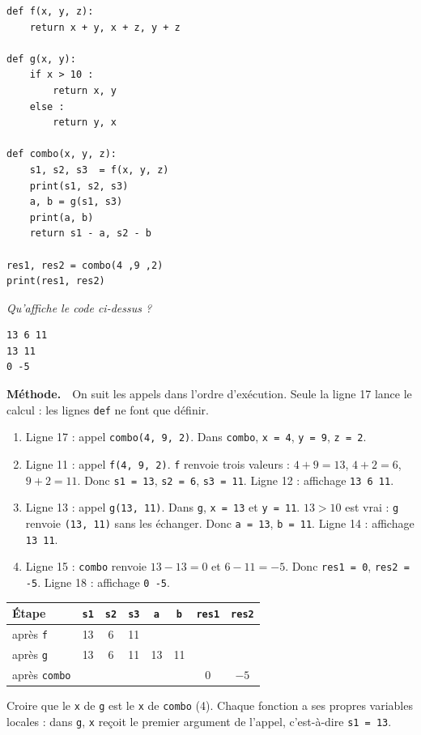 \documentclass[addpoints, 11pt]{exam}
\newcommand{\enonce}[1]{\textit{#1}\par\smallskip}
\newcommand{\methode}{\par\smallskip\noindent\textbf{Méthode.}\ }
\newcommand{\code}[1]{\texttt{#1}}
\DeclareRobustCommand{\_}{\textunderscore\allowbreak}
\begin{document}
\begin{questions}
\begin{lstlisting}
def f(x, y, z):
    return x + y, x + z, y + z

def g(x, y):
    if x > 10 :
        return x, y
    else :
        return y, x

def combo(x, y, z):
    s1, s2, s3  = f(x, y, z)
    print(s1, s2, s3)
    a, b = g(s1, s3)
    print(a, b)
    return s1 - a, s2 - b

res1, res2 = combo(4 ,9 ,2)
print(res1, res2)
\end{lstlisting}

\question[3] \enonce{Qu'affiche le code ci-dessus ?}
\begin{reponse}
\begin{lstlisting}[style=sortie]
13 6 11
13 11
0 -5
\end{lstlisting}
\end{reponse}
\methode\ On suit les appels dans l'ordre d'exécution. Seule la ligne 17 lance le calcul : les lignes \code{def} ne font que définir.
\begin{enumerate}
  \item Ligne 17 : appel \code{combo(4, 9, 2)}. Dans \code{combo}, \code{x = 4}, \code{y = 9}, \code{z = 2}.
  \item Ligne 11 : appel \code{f(4, 9, 2)}. \code{f} renvoie trois valeurs : $4 + 9 = 13$, $4 + 2 = 6$, $9 + 2 = 11$. Donc \code{s1 = 13}, \code{s2 = 6}, \code{s3 = 11}. Ligne 12 : affichage \code{13 6 11}.
  \item Ligne 13 : appel \code{g(13, 11)}. Dans \code{g}, \code{x = 13} et \code{y = 11}. $13 > 10$ est vrai : \code{g} renvoie \code{(13, 11)} sans les échanger. Donc \code{a = 13}, \code{b = 11}. Ligne 14 : affichage \code{13 11}.
  \item Ligne 15 : \code{combo} renvoie $13 - 13 = 0$ et $6 - 11 = -5$. Donc \code{res1 = 0}, \code{res2 = -5}. Ligne 18 : affichage \code{0 -5}.
\end{enumerate}
\begin{center}
\begin{tabular}{|l|c|c|c|c|c|c|c|}
\hline
Étape & \code{s1} & \code{s2} & \code{s3} & \code{a} & \code{b} & \code{res1} & \code{res2} \\ \hline
après \code{f} & 13 & 6 & 11 & & & & \\
après \code{g} & 13 & 6 & 11 & 13 & 11 & & \\
après \code{combo} & & & & & & 0 & $-5$ \\ \hline
\end{tabular}
\end{center}
\begin{erreur}
Croire que le \code{x} de \code{g} est le \code{x} de \code{combo} (4). Chaque fonction a ses propres variables locales : dans \code{g}, \code{x} reçoit le premier argument de l'appel, c'est-à-dire \code{s1 = 13}.
\end{erreur}


\end{questions}
\end{document}
